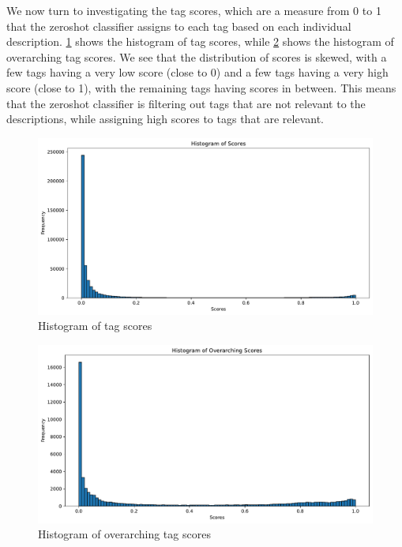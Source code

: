 We now turn to investigating the tag scores, which are a measure from 0 to 1 that the zeroshot classifier assigns to each tag based on each individual description. \cref{fig:histogram_scores} shows the histogram of tag scores, while \cref{fig:histogram_overarching_scores} shows the histogram of overarching tag scores. We see that the distribution of scores is skewed, with a few tags having a very low score (close to 0) and a few tags having a very high score (close to 1), with the remaining tags having scores in between. This means that the zeroshot classifier is filtering out tags that are not relevant to the descriptions, while assigning high scores to tags that are relevant.

\begin{figure}[h]
    \centering
    \includegraphics[width=\textwidth]{figures/histogram_scores.pdf}
    \caption{Histogram of tag scores}
    \label{fig:histogram_scores}
\end{figure}

\begin{figure}[h]
    \centering
    \includegraphics[width=\textwidth]{figures/histogram_overarching_scores.pdf}
    \caption{Histogram of overarching tag scores}
    \label{fig:histogram_overarching_scores}
\end{figure}

